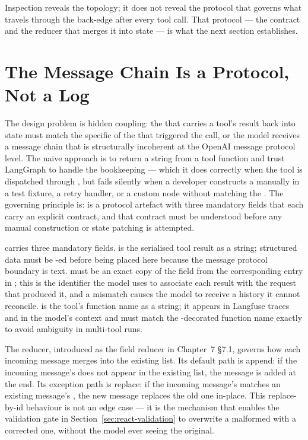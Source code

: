 Inspection reveals the topology; it does not reveal the protocol that
governs what travels through the back-edge after every tool call. That
protocol --- the  contract and the reducer that merges
it into state --- is what the next section establishes.


\section{The Message Chain Is a Protocol, Not a Log}
\label{sec:react-toolmessage}

The design problem is hidden coupling: the  that carries
a tool's result back into state must match the specific 
of the  that triggered the call, or the model receives a
message chain that is structurally incoherent at the OpenAI message
protocol level. The naive approach is to return a string from a tool
function and trust LangGraph to handle the bookkeeping --- which it does
correctly when the tool is dispatched through , but fails
silently when a developer constructs a  manually in a
test fixture, a retry handler, or a custom node without matching the
. The governing principle is:  is a
protocol artefact with three mandatory fields that each carry an
explicit contract, and that contract must be understood before any manual
construction or state patching is attempted.

 carries three mandatory fields.  is the
serialised tool result as a string; structured data must be
-ed before being placed here because the message
protocol boundary is text.  must be an exact copy of
the  field from the corresponding entry in
; this is the identifier the model uses to
associate each result with the request that produced it, and a mismatch
causes the model to receive a history it cannot reconcile.  is
the tool's function name as a string; it appears in Langfuse traces and in
the model's context and must match the -decorated function name
exactly to avoid ambiguity in multi-tool runs.

The  reducer, introduced as the  field
reducer in Chapter~7 \S7.1, governs how each incoming message merges into
the existing list. Its default path is append: if the incoming message's
 does not appear in the existing list, the message is added at the
end. Its exception path is replace: if the incoming message's 
matches an existing message's , the new message replaces the old
one in-place. This replace-by-id behaviour is not an edge case --- it is the
mechanism that enables the validation gate in Section~\ref{sec:react-validation}
to overwrite a malformed  with a corrected one, without
the model ever seeing the original.

